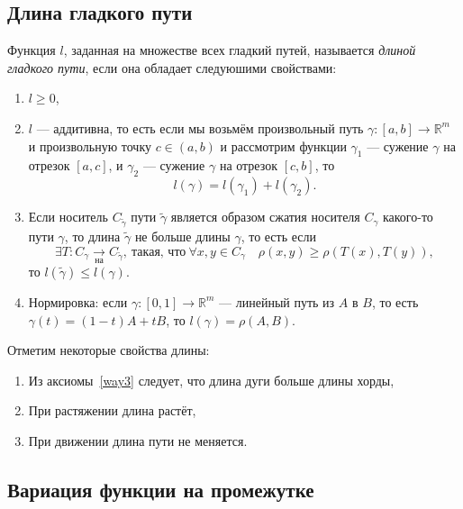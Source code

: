 \subsection{Длина гладкого пути}

\begin{definition}
	Функция \(l\), заданная на множестве всех гладкий путей, называется \textit{длиной гладкого пути}, если она обладает следуюшими свойствами:
	\begin{enumerate}
		\item \(l \geqslant 0\),
		\item \label{way2} \(l\) --- аддитивна, то есть если мы возьмём произвольный путь \(\gamma \colon [a, b] \to \mathbb{R}^m\) и произвольную точку \(c \in (a, b)\) и рассмотрим функции \(\gamma_1\) --- сужение \(\gamma\) на отрезок \([a, c]\), и \(\gamma_2\) --- сужение \(\gamma\) на отрезок \([c, b]\), то \[
			l(\gamma) = l(\gamma_1) + l(\gamma_2).
		\]
		\item \label{way3}Если носитель \(C_{\widetilde{\gamma}}\) пути \(\widetilde{\gamma}\) является образом сжатия носителя \(C_\gamma\) какого-то пути \(\gamma\), то длина 	\(\widetilde{\gamma}\) не больше длины \(\gamma\), то есть если \[
			\exists T \colon C_\gamma \xrightarrow[\text{на}]{} C_{\widetilde{\gamma}}, \ \textit{такая, что} \ \forall x, y \in C_\gamma \quad \rho(x, y) \geqslant \rho(T(x), T(y)),
		\]
		то \(l(\widetilde{\gamma}) \leqslant l(\gamma)\).
		\item Нормировка: если \(\gamma \colon [0, 1] \to \mathbb{R}^m\) --- линейный путь из \(A\) в \(B\), то есть \(\gamma(t) = (1 - t)A + tB\), то \(l(\gamma) = \rho(A, B)\).
	\end{enumerate}
\end{definition}

\begin{remark}
	Отметим некоторые свойства длины:
	\begin{enumerate}
		\item Из аксиомы~\ref{way3} следует, что длина дуги больше длины хорды,
		\item При растяжении длина растёт,
		\item При движении длина пути не меняется.
	\end{enumerate}
\end{remark}

\subsection{Вариация функции на промежутке}

